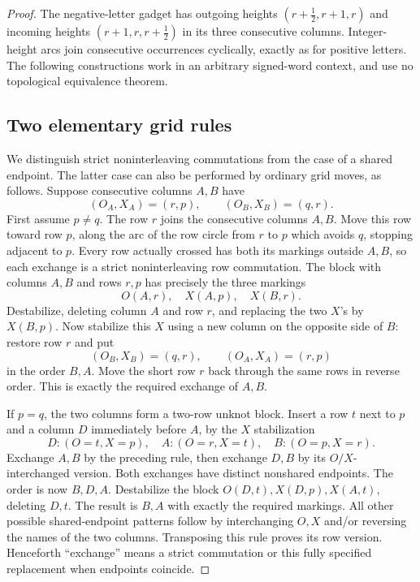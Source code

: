 \documentclass[11pt,a4paper]{article}
\theoremstyle{remark}
\begin{document}
\begin{proof}

The negative-letter gadget has outgoing heights
$(r+\tfrac12,r+1,r)$ and incoming heights
$(r+1,r,r+\tfrac12)$ in its three consecutive columns.  Integer-height
arcs join consecutive occurrences cyclically, exactly as for positive
letters.  The following constructions work in an arbitrary signed-word
context, and use no topological equivalence theorem.

\subsection{Two elementary grid rules}

We distinguish strict noninterleaving commutations from the case of a
shared endpoint.  The latter case can also be performed by ordinary grid
moves, as follows.  Suppose consecutive columns $A,B$ have
\[
 (O_A,X_A)=(r,p),\qquad (O_B,X_B)=(q,r).
\]
First assume $p\ne q$.  The row $r$ joins the consecutive columns $A,B$.
Move this row toward row $p$, along the arc of the row circle from $r$
to $p$ which avoids $q$, stopping adjacent to $p$.  Every row actually
crossed has both its markings outside $A,B$, so each exchange is a strict
noninterleaving row commutation.  The block with columns $A,B$ and rows
$r,p$ has precisely the three markings
\[
 O(A,r),\quad X(A,p),\quad X(B,r).
\]
Destabilize, deleting column $A$ and row $r$, and replacing the two $X$'s
by $X(B,p)$.  Now stabilize this $X$ using a new column on the opposite
side of $B$: restore row $r$ and put
\[
 (O_B,X_B)=(q,r),\qquad (O_A,X_A)=(r,p)
\]
in the order $B,A$.  Move the short row $r$ back through the same rows
in reverse order.  This is exactly the required exchange of $A,B$.

If $p=q$, the two columns form a two-row unknot block.  Insert a row $t$
next to $p$ and a column $D$ immediately before $A$, by the $X$
stabilization
\[
 D:(O=t,X=p),\quad A:(O=r,X=t),\quad B:(O=p,X=r).
\]
Exchange $A,B$ by the preceding rule, then exchange $D,B$ by its
$O/X$-interchanged version.  Both exchanges have distinct nonshared
endpoints.  The order is now $B,D,A$.  Destabilize the block
$O(D,t),X(D,p),X(A,t)$, deleting $D,t$.  The result is $B,A$ with exactly
the required markings.  All other possible shared-endpoint patterns
follow by interchanging $O,X$ and/or reversing the names of the two
columns.  Transposing this rule proves its row version.  Henceforth
``exchange'' means a strict commutation or this fully specified
replacement when endpoints coincide.


\end{proof}
\end{document}
